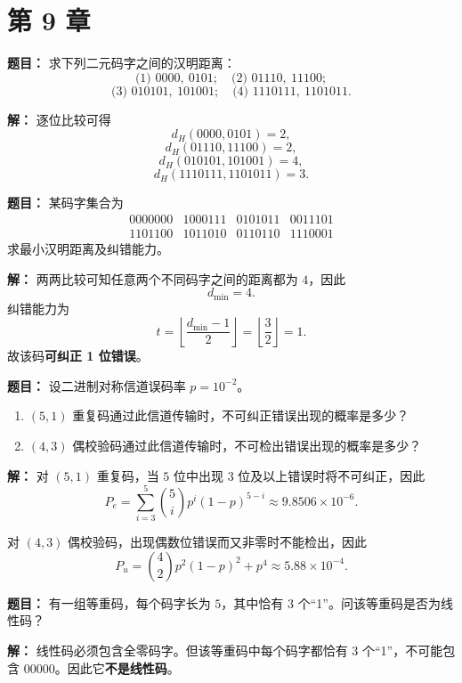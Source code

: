 \section*{第 9 章}

\textbf{题目：}
求下列二元码字之间的汉明距离：
\[
\text{(1) }0000,\ 0101;\quad
\text{(2) }01110,\ 11100;
\]
\[
\text{(3) }010101,\ 101001;\quad
\text{(4) }1110111,\ 1101011.
\]

\par\textbf{解：}
逐位比较可得
\[
d_H(0000,0101)=2,
\]
\[
d_H(01110,11100)=2,
\]
\[
d_H(010101,101001)=4,
\]
\[
d_H(1110111,1101011)=3.
\]

\medskip
{}
\textbf{题目：}
某码字集合为
\[
\begin{array}{cccc}
0000000 & 1000111 & 0101011 & 0011101\\
1101100 & 1011010 & 0110110 & 1110001
\end{array}
\]
求最小汉明距离及纠错能力。

\par\textbf{解：}
两两比较可知任意两个不同码字之间的距离都为 $4$，因此
\[
d_{\min}=4.
\]
纠错能力为
\[
t=\left\lfloor \frac{d_{\min}-1}{2}\right\rfloor=\left\lfloor \frac{3}{2}\right\rfloor=1.
\]
故该码\textbf{可纠正 1 位错误}。

\medskip
{}
\textbf{题目：}
设二进制对称信道误码率 $p=10^{-2}$。
\begin{enumerate}
\item $(5,1)$ 重复码通过此信道传输时，不可纠正错误出现的概率是多少？
\item $(4,3)$ 偶校验码通过此信道传输时，不可检出错误出现的概率是多少？
\end{enumerate}

\par\textbf{解：}
对 $(5,1)$ 重复码，当 $5$ 位中出现 $3$ 位及以上错误时将不可纠正，因此
\[
P_e=\sum_{i=3}^{5}\binom{5}{i}p^i(1-p)^{5-i}
\approx 9.8506\times 10^{-6}.
\]

对 $(4,3)$ 偶校验码，出现偶数位错误而又非零时不能检出，因此
\[
P_u=\binom{4}{2}p^2(1-p)^2+p^4
\approx 5.88\times 10^{-4}.
\]

\medskip
{}
\textbf{题目：}
有一组等重码，每个码字长为 $5$，其中恰有 $3$ 个“1”。问该等重码是否为线性码？

\par\textbf{解：}
线性码必须包含全零码字。但该等重码中每个码字都恰有 $3$ 个“1”，不可能包含 $00000$。因此它\textbf{不是线性码}。

